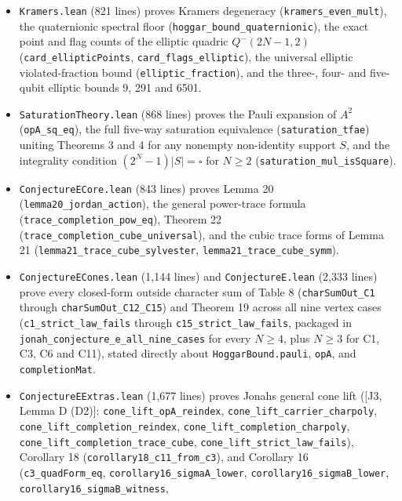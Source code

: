 \documentclass[11pt,a4paper]{article}
\providecommand{\tightlist}{\setlength{\itemsep}{0pt}\setlength{\parskip}{0pt}}
\begin{document}
\begin{itemize}
\tightlist
\item
  \texttt{Kramers.lean} (821 lines) proves Kramers degeneracy (\texttt{kramers\_even\_mult}), the quaternionic spectral
  floor (\nolinkurl{hoggar_bound_quaternionic}), the exact point and flag counts of the elliptic quadric
  \(Q^-(2N-1,2)\) (\nolinkurl{card_ellipticPoints}, \nolinkurl{card_flags_elliptic}), the universal elliptic violated-fraction
  bound (\texttt{elliptic\_fraction}), and the three-, four- and five-qubit elliptic bounds 9, 291 and 6501.
\item
  \nolinkurl{SaturationTheory.lean} (868 lines) proves the Pauli expansion of \(A^2\) (\texttt{opA\_sq\_eq}), the full
  five-way saturation equivalence (\texttt{saturation\_tfae}) uniting Theorems 3 and 4 for any nonempty
  non-identity support \(S\), and the integrality condition \((2^N-1)|S|=\square\) for \(N\ge2\)
  (\nolinkurl{saturation_mul_isSquare}).
\item
  \nolinkurl{ConjectureECore.lean} (843 lines) proves Lemma 20 (\nolinkurl{lemma20_jordan_action}), the general power-trace
  formula (\nolinkurl{trace_completion_pow_eq}), Theorem 22 (\nolinkurl{trace_completion_cube_universal}), and the cubic
  trace forms of Lemma 21 (\nolinkurl{lemma21_trace_cube_sylvester}, \nolinkurl{lemma21_trace_cube_symm}).
\item
  \nolinkurl{ConjectureECones.lean} (1,144 lines) and \texttt{ConjectureE.lean} (2,333 lines) prove every closed-form
  outside character sum of Table 8 (\texttt{charSumOut\_C1} through \nolinkurl{charSumOut_C12_C15}) and Theorem 19 across
  all nine vertex cases (\nolinkurl{c1_strict_law_fails} through \nolinkurl{c15_strict_law_fails}, packaged in
  \nolinkurl{jonah_conjecture_e_all_nine_cases} for every \(N\ge4\), plus \(N\ge3\) for C1, C3, C6 and C11), stated
  directly about \texttt{HoggarBound.pauli}, \texttt{opA}, and \texttt{completionMat}.
\item
  \nolinkurl{ConjectureEExtras.lean} (1,677 lines) proves Jonah\textquotesingle s general cone lift ({[}J3, Lemma D (D2){]}:
  \nolinkurl{cone_lift_opA_reindex}, \nolinkurl{cone_lift_carrier_charpoly}, \nolinkurl{cone_lift_completion_reindex},
  \nolinkurl{cone_lift_completion_charpoly}, \nolinkurl{cone_lift_completion_trace_cube}, \nolinkurl{cone_lift_strict_law_fails}),
  Corollary 18 (\nolinkurl{corollary18_c11_from_c3}), and Corollary 16 (\texttt{c3\_quadForm\_eq},
  \nolinkurl{corollary16_sigmaA_lower}, \nolinkurl{corollary16_sigmaB_lower}, \nolinkurl{corollary16_sigmaB_witness},

\end{itemize}
\end{document}
